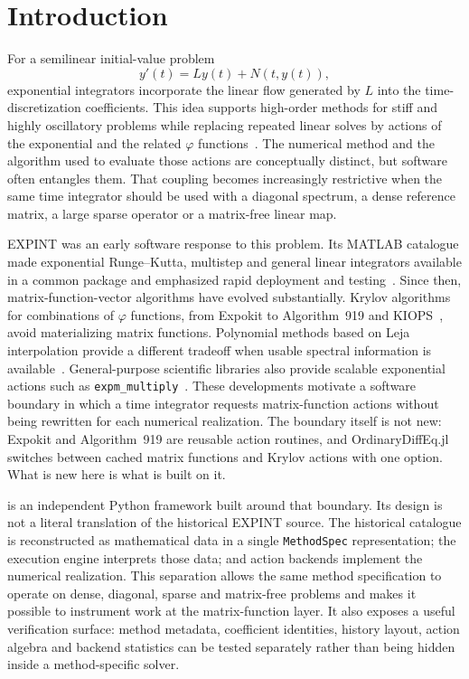 \section{Introduction}\label{sec:introduction}

For a semilinear initial-value problem
\begin{equation}
  y'(t)=Ly(t)+N(t,y(t)),
  \label{eq:semilinear-intro}
\end{equation}
exponential integrators incorporate the linear flow generated by $L$ into the
time-discretization coefficients.  This idea supports high-order methods for
stiff and highly oscillatory problems while replacing repeated linear solves by
actions of the exponential and the related $\varphi$
functions~\cite{HochbruckOstermann2010}.  The numerical method and the
algorithm used to evaluate those actions are conceptually distinct, but
software often entangles them.  That coupling becomes increasingly restrictive
when the same time integrator should be used with a diagonal spectrum, a dense
reference matrix, a large sparse operator or a matrix-free linear map.

EXPINT was an early software response to this problem.  Its MATLAB catalogue
made exponential Runge--Kutta, multistep and general linear integrators
available in a common package and emphasized rapid deployment and
testing~\cite{BerlandSkaflestadWright2007}.  Since then, matrix-function-vector
algorithms have evolved substantially.  Krylov algorithms for combinations of
$\varphi$ functions, from Expokit to Algorithm~919 and
KIOPS~\cite{Sidje1998,NiesenWright2012,GaudreaultRainwaterTokman2018}, avoid
materializing matrix functions.  Polynomial methods based on Leja
interpolation provide a different tradeoff when usable spectral information is
available~\cite{CaliariVianelloBergamaschi2004,CaliariKandolfOstermannRainer2016,DekaEinkemmerTokman2023}.
General-purpose scientific libraries also provide scalable exponential actions
such as \texttt{expm\_multiply}~\cite{AlMohyHigham2011,VirtanenEtAl2020}.  These
developments motivate a software boundary in which a time integrator requests
matrix-function actions without being rewritten for each numerical
realization.  The boundary itself is not new: Expokit and Algorithm~919 are
reusable action routines, and OrdinaryDiffEq.jl switches between cached matrix
functions and Krylov actions with one option.  What is new here is what is
built on it.

\pkg{} is an independent Python framework built around that boundary.  Its
design is not a literal translation of the historical EXPINT source.  The
historical catalogue is reconstructed as mathematical data in a single
\texttt{MethodSpec} representation; the execution engine interprets those data;
and action backends implement the numerical realization.  This separation
allows the same method specification to operate on dense, diagonal, sparse and
matrix-free problems and makes it possible to instrument work at the
matrix-function layer.  It also exposes a useful verification surface: method
metadata, coefficient identities, history layout, action algebra and backend
statistics can be tested separately rather than being hidden inside a
method-specific solver.

